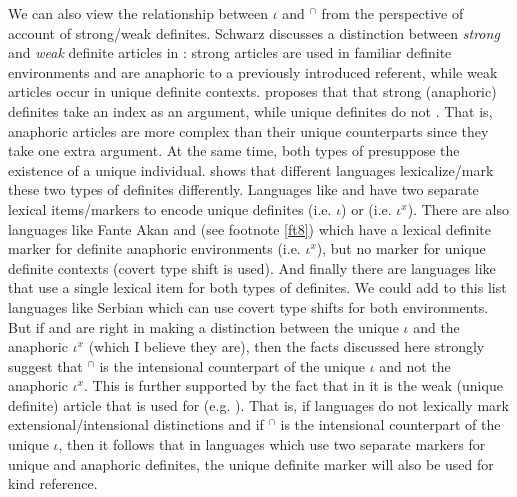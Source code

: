 \documentclass[output=paper,
modfonts
]{langscibook}
\begin{document}
	
	We can also view the relationship between $\iota$ and $^\cap$ from the perspective of  account of strong/weak definites. Schwarz discusses a distinction between \textit{strong} and \textit{weak} definite articles in : strong articles are used in familiar definite environments and are anaphoric to a previously introduced referent, while weak articles occur in unique definite contexts. \citeauthor{Schwarz2009} proposes that that strong (anaphoric) definites take an index as an argument, while unique definites do not \citep[see also][]{Jenkstoappear}. That is, anaphoric articles are more complex than their unique counterparts since they take one extra argument. At the same time, both types of  presuppose the existence of a unique individual. \citet{Jenkstoappear} shows that different languages lexicalize/mark these two types of definites differently. Languages like  and  \citep[see][]{Schwarz2013} have two separate lexical items/markers to encode unique definites (i.e. $\iota$) or  (i.e. $\iota^x$). There are also languages like Fante Akan and  (see footnote \ref{ft8}) which have a lexical definite marker for definite anaphoric environments (i.e. $\iota^x$), but no marker for unique definite contexts (covert type shift is used). And finally there are languages like  that use a single lexical item for both types of definites. We could add to this list languages like Serbian which can use covert type shifts for both environments. But if \citeauthor{Schwarz2009} and \citeauthor{Jenkstoappear} are right in making a distinction between the unique $\iota$ and the anaphoric $\iota^x$ (which I believe they are), then the facts discussed here strongly suggest that $^\cap$ is the intensional counterpart of the unique $\iota$ and not the anaphoric $\iota^x$. This is further supported by the fact that in  it is the weak (unique definite) article that is used for  (e.g. \citealt[65-66]{Schwarz2009}). That is, if languages do not lexically mark extensional/intensional distinctions and if $^\cap$ is the intensional counterpart of the unique $\iota$, then it follows that in languages which use two separate markers for unique and anaphoric definites, the unique definite marker will also be used for kind reference. 
	
\end{document}
